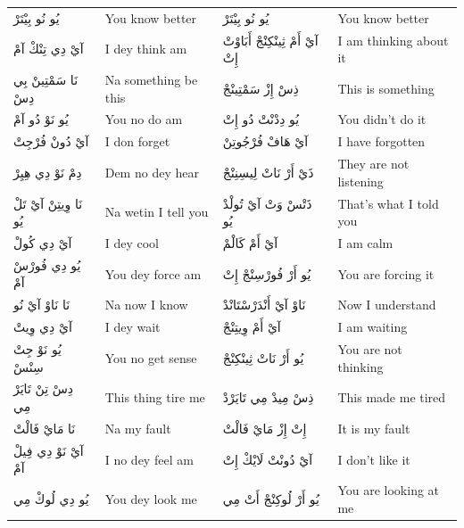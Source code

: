 \documentclass[12pt]{article}
\newcommand{\AR}[1]{\foreignlanguage{arabic}{#1}}
\begin{document}
\begin{longtable}{p{3.2cm} p{3.2cm} p{3.2cm} p{3.2cm}}
\AR{يُو} \AR{نُو} \AR{بِيْتَرْ} & You know better & \AR{يُو} \AR{نُو} \AR{بِيْتَرْ} & You know better \\
\AR{آيْ} \AR{دِي} \AR{تِنْكْ} \AR{آمْ} & I dey think am & \AR{آيْ} \AR{أَمْ} \AR{ثِينْكِنْجْ} \AR{أَبَاوْتْ} \AR{إِتْ} & I am thinking about it \\
\AR{نَا} \AR{سَمْتِينْ} \AR{بِي} \AR{دِسْ} & Na something be this & \AR{ذِسْ} \AR{إِزْ} \AR{سَمْتِينْجْ} & This is something \\
\AR{يُو} \AR{نَوْ} \AR{دُو} \AR{آمْ} & You no do am & \AR{يُو} \AR{دِدْنْتْ} \AR{دُو} \AR{إِتْ} & You didn’t do it \\
\AR{آيْ} \AR{دُونْ} \AR{فُرْجِتْ} & I don forget & \AR{آيْ} \AR{هَافْ} \AR{فُرْجُوتِنْ} & I have forgotten \\
\AR{دِمْ} \AR{نَوْ} \AR{دِي} \AR{هِيِرْ} & Dem no dey hear & \AR{ذَيْ} \AR{أَرْ} \AR{نَاتْ} \AR{لِيسِنِنْجْ} & They are not listening \\
\AR{نَا} \AR{وِيتِنْ} \AR{آيْ} \AR{تَلْ} \AR{يُو} & Na wetin I tell you & \AR{ذَتْسْ} \AR{وَتْ} \AR{آيْ} \AR{تُولْدْ} \AR{يُو} & That’s what I told you \\
\AR{آيْ} \AR{دِي} \AR{كُولْ} & I dey cool & \AR{آيْ} \AR{أَمْ} \AR{كَالْمْ} & I am calm \\
\AR{يُو} \AR{دِي} \AR{فُورْسْ} \AR{آمْ} & You dey force am & \AR{يُو} \AR{أَرْ} \AR{فُورْسِنْجْ} \AR{إِتْ} & You are forcing it \\
\AR{نَا} \AR{نَاوْ} \AR{آيْ} \AR{نُو} & Na now I know & \AR{نَاوْ} \AR{آيْ} \AR{أَنْدَرْسْتَانْدْ} & Now I understand \\
\AR{آيْ} \AR{دِي} \AR{وِيتْ} & I dey wait & \AR{آيْ} \AR{أَمْ} \AR{وِيتِنْجْ} & I am waiting \\
\AR{يُو} \AR{نَوْ} \AR{جِتْ} \AR{سِنْسْ} & You no get sense & \AR{يُو} \AR{أَرْ} \AR{نَاتْ} \AR{ثِينْكِنْجْ} & You are not thinking \\
\AR{دِسْ} \AR{تِنْ} \AR{تَايَرْ} \AR{مِي} & This thing tire me & \AR{ذِسْ} \AR{مِيدْ} \AR{مِي} \AR{تَايَرْدْ} & This made me tired \\
\AR{نَا} \AR{مَايْ} \AR{فَالْتْ} & Na my fault & \AR{إِتْ} \AR{إِزْ} \AR{مَايْ} \AR{فَالْتْ} & It is my fault \\
\AR{آيْ} \AR{نَوْ} \AR{دِي} \AR{فِيلْ} \AR{آمْ} & I no dey feel am & \AR{آيْ} \AR{دُونْتْ} \AR{لَايْكْ} \AR{إِتْ} & I don’t like it \\
\AR{يُو} \AR{دِي} \AR{لُوكْ} \AR{مِي} & You dey look me & \AR{يُو} \AR{أَرْ} \AR{لُوكِنْجْ} \AR{أَتْ} \AR{مِي} & You are looking at me \\

\end{longtable}
\end{document}

